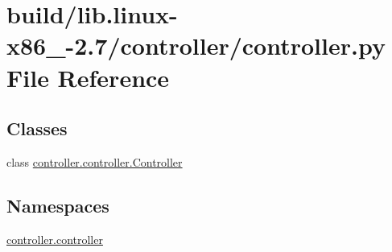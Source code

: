 \hypertarget{build_2lib_8linux-x86__64-2_87_2controller_2controller_8py}{}\section{build/lib.linux-\/x86\+\_-\/2.7/controller/controller.py File Reference}
\label{build_2lib_8linux-x86__64-2_87_2controller_2controller_8py}
\subsection*{Classes}
\begin{DoxyCompactItemize}
\item 
class \hyperlink{classcontroller_1_1controller_1_1Controller}{controller.\+controller.\+Controller}
\end{DoxyCompactItemize}
\subsection*{Namespaces}
\begin{DoxyCompactItemize}
\item 
 \hyperlink{namespacecontroller_1_1controller}{controller.\+controller}
\end{DoxyCompactItemize}
